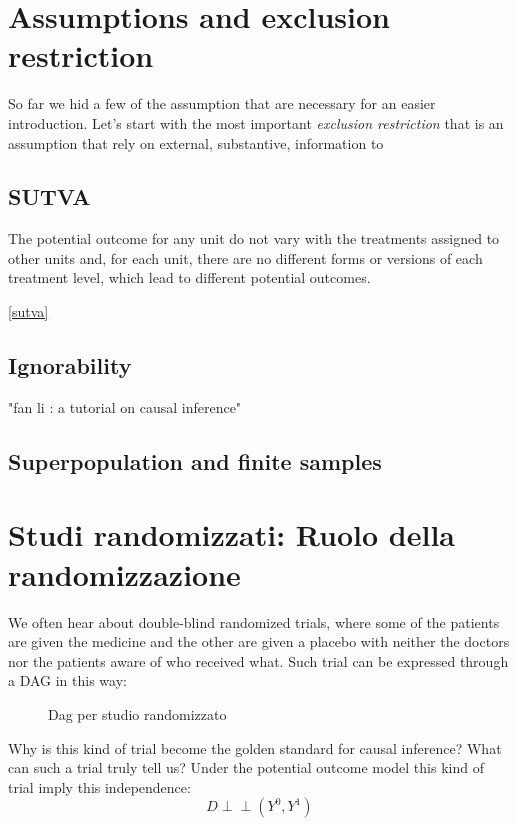 \section{Assumptions and exclusion restriction}
So far we hid a few of the assumption that are necessary for an easier  introduction. 
Let's start with the most important \textit{exclusion restriction} that is  an assumption that rely on external, substantive, information to 

\citep{imbens2015causal}

\subsection{SUTVA}
\begin{ass}
The potential outcome for any unit do not vary with the treatments assigned to other units and, for each unit, there are no different forms or versions of each treatment level, which lead to different potential outcomes.
\label{sutva}
\end{ass}
\citep{imbens2015causal}
\ref{sutva}

\subsection{Ignorability}

"fan li : a tutorial on causal inference"
\subsection{Superpopulation and finite samples}



\section{Studi randomizzati: Ruolo della randomizzazione}
We often hear about double-blind randomized trials, where some of the patients are given the medicine and the other are given a placebo with neither the doctors nor the patients aware of who received what. Such trial can be expressed through a DAG in this way: 
\begin{figure}[H]
\centering
\caption{Dag per studio randomizzato}
\label{fig:dag_random_EX}
\end{figure}
Why is this kind of trial become the golden standard for causal inference? What can such a trial truly tell us?
Under the potential outcome model this kind of trial imply this independence:
\begin{equation}
D \perp\!\!\!\perp (Y^{0},Y^{1})
\end{equation}
\label{eq:indipendence_r}

